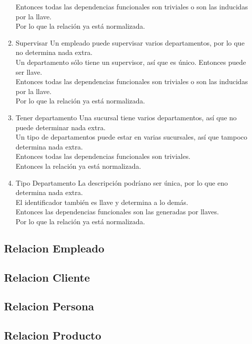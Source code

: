 \documentclass[10pt]{article}
\begin{document}
\begin{enumerate}
	Entonces todas las dependencias funcionales son triviales o son las
	inducidas por la llave.\\
	Por lo que la relación ya está normalizada.
	\item Supervisar
	Un empleado puede supervisar varios departamentos, por lo que no determina nada
	extra.\\
	Un departamento sólo tiene un supervisor, así que es único. Entonces puede ser
	llave.\\
	Entonces todas las dependencias funcionales son triviales o son las
	inducidas por la llave.\\
	Por lo que la relación ya está normalizada.
	\item Tener departamento
	Una sucursal tiene varios departamentos, así que no puede determinar nada
	extra.\\
	Un tipo de departamentos puede estar en varias sucursales, así que tampoco
	determina nada extra.\\
	Entonces todas las dependencias funcionales son triviales.\\
	Entonces la relación ya está normalizada.
	\item Tipo Departamento
	La descripción podríano ser única, por lo que eno determina nada extra.\\
	El identificador también es llave y determina a lo demás.\\
	Entonces las dependencias funcionales son las generadas por llaves. \\
	Por lo que la relación ya está normalizada.
\end{enumerate}

\subsection{Relacion Empleado}
\subsection{Relacion Cliente}
\subsection{Relacion Persona}

\subsection{Relacion Producto}

\end{document}
